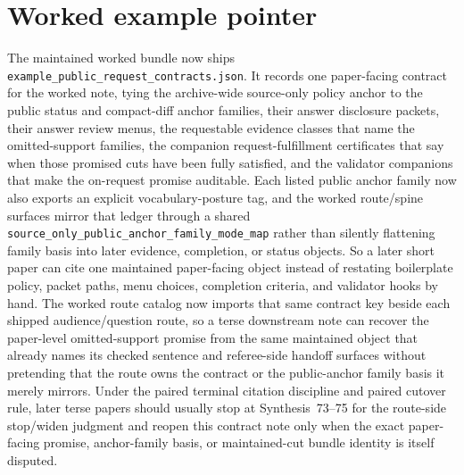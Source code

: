 \documentclass[11pt]{article}
\begin{document}
\section{Worked example pointer}
The maintained worked bundle now ships \nolinkurl{example_public_request_contracts.json}.\cite{series:workedexample}
It records one paper-facing contract for the worked note, tying the archive-wide source-only policy anchor to the public status and compact-diff anchor families, their answer disclosure packets, their answer review menus, the requestable evidence classes that name the omitted-support families, the companion request-fulfillment certificates that say when those promised cuts have been fully satisfied, and the validator companions that make the on-request promise auditable. Each listed public anchor family now also exports an explicit vocabulary-posture tag, and the worked route/spine surfaces mirror that ledger through a shared \nolinkurl{source_only_public_anchor_family_mode_map} rather than silently flattening family basis into later evidence, completion, or status objects.\cite{series:requestfulfillmentcertificates}
So a later short paper can cite one maintained paper-facing object instead of restating boilerplate policy, packet paths, menu choices, completion criteria, and validator hooks by hand. The worked route catalog now imports that same contract key beside each shipped audience/question route, so a terse downstream note can recover the paper-level omitted-support promise from the same maintained object that already names its checked sentence and referee-side handoff surfaces without pretending that the route owns the contract or the public-anchor family basis it merely mirrors. Under the paired terminal citation discipline and paired cutover rule, later terse papers should usually stop at Synthesis~73--75 for the route-side stop/widen judgment and reopen this contract note only when the exact paper-facing promise, anchor-family basis, or maintained-cut bundle identity is itself disputed.\cite{series:requestsideterminalcitationnormalform,series:pairedterminalcitationdiscipline,series:pairedterminalcutoverrules}
\end{document}
